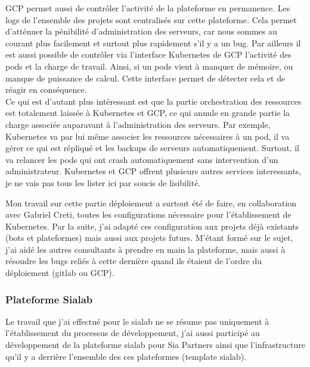 \documentclass{article} %
\begin{document}
GCP permet aussi de contrôler l'activité de la plateforme en permanence. Les logs de l'ensemble des projets sont centralisés sur cette plateforme. Cela permet d'atténuer la pénibilité d'administration des serveurs, car nous sommes au courant plus facilement et surtout plus rapidement s'il y a un bug. Par ailleurs il est aussi possible de contrôler via l'interface Kubernetes de GCP l'activité des pods et la charge de travail. Ainsi, si un pods vient à manquer de mémoire, ou manque de puissance de calcul. Cette interface permet de détecter cela et de réagir en conséquence.\\
Ce qui est d'autant plus intéressant est que la partie orchestration des ressources est totalement laissée à Kubernetes et GCP, ce qui annule en grande partie la charge associée auparavant à l'administration des serveurs. Par exemple, Kubernetes va par lui même associer les ressources nécessaires à un pod, il va gérer ce qui est répliqué et les backups de serveurs automatiquement. Surtout, il va relancer les pods qui ont crash automatiquement sans intervention d'un administrateur. Kubernetes et GCP offrent plusieurs autres services interessants, je ne vais pas tous les lister ici par soucis de lisibilité. 


Mon travail sur cette partie déploiement a surtout été de faire, en collaboration avec Gabriel Creti, toutes les configurations nécessaire pour l'établissement de Kubernetes. Par la suite, j'ai adapté ces configuration aux projets déjà existants (bots et plateformes) mais aussi aux projets futurs. M'étant formé sur le sujet, j'ai aidé les autres consultants à prendre en main la plateforme, mais aussi à résoudre les bugs reliés à cette dernière quand ils étaient de l'ordre du déploiement (gitlab ou GCP). 

\subsubsection{Plateforme Sialab}
Le travail que j'ai effectué pour le sialab ne se résume pas uniquement à l'établissement du processus de développement, j'ai aussi participé au développement de la plateforme sialab pour Sia Partners ainsi que l'infrastructure qu'il y a derrière l'ensemble des ces plateformes (template sialab).\\
\end{document}
